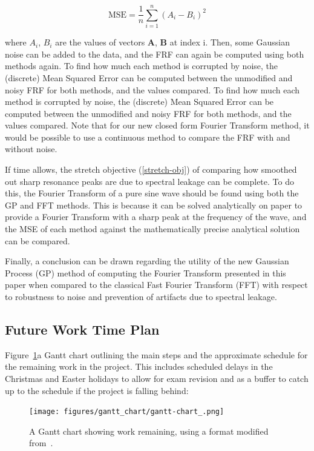 \documentclass[12pt]{article}
\begin{document}
    \begin{equation}
        \text{MSE} = \frac{1}{n} \sum_{i=1}^{n} (A_i - B_i)^2
        \label{eq:mse}
    \end{equation}


    where $A_i$, $B_i$ are the values of vectors $\mathbf{A}$, $\mathbf{B}$ at index i.
    Then, some Gaussian noise can be added to the data, and the FRF can again be computed using both methods again.
    To find how much each method is corrupted by noise, the (discrete) Mean Squared Error can be computed between the unmodified and noisy FRF for both methods, and the values compared.
    To find how much each method is corrupted by noise, the (discrete) Mean Squared Error can be computed between the unmodified and noisy FRF for both methods, and the values compared.
    Note that for our new closed form Fourier Transform method, it would be possible to use a continuous method to compare the FRF with and without noise.

    If time allows, the stretch objective (\ref{stretch-obj}) of comparing how smoothed out sharp resonance peaks are due to spectral leakage can be complete.
    To do this, the Fourier Transform of a pure sine wave should be found using both the GP and FFT methods.
    This is because it can be solved analytically on paper to provide a Fourier Transform with a sharp peak at the frequency of the wave, and the MSE of each method against the mathematically precise analytical solution can be compared.

    Finally, a conclusion can be drawn regarding the utility of the new Gaussian Process (GP) method of computing the Fourier Transform presented in this paper when compared to the classical Fast Fourier Transform (FFT) with respect to robustness to noise and prevention of artifacts due to spectral leakage.

    \subsection{Future Work Time Plan}
    Figure~\ref{fig:gantt-chart_}a Gantt chart outlining the main steps and the approximate schedule for the remaining work in the project.
    This includes scheduled delays in the Christmas and Easter holidays to allow for exam revision and as a buffer to catch up to the schedule if the project is falling behind:

    \begin{landscape}
        \begin{figure}[p] %
            \centering
            \texttt{[image: figures/gantt\_chart/gantt-chart\_.png]}
            \caption{A Gantt chart showing work remaining, using a format modified from~\cite{DataCampGanttChart2021}.}
            \label{fig:gantt-chart_}
        \end{figure}
    \end{landscape}

%    

    \printbibliography
\end{document}
